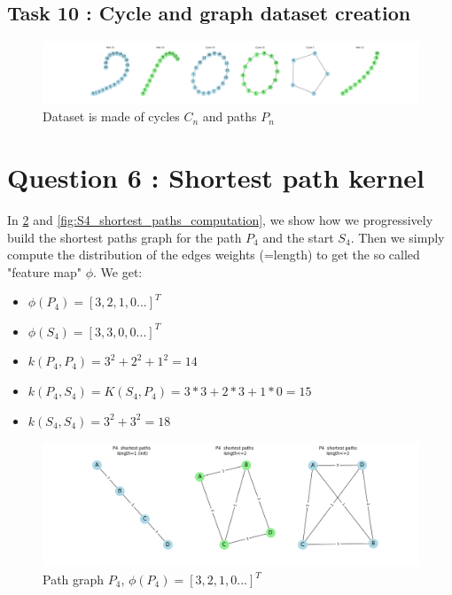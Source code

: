 \documentclass[a4paper]{article}
\begin{document}
\subsection*{Task 10 : Cycle and graph dataset creation}

\begin{figure}[ht]
        \centering
        \includegraphics[width=1.\textwidth]{figures/cycle_and_paths_dataset.png}
        \caption{Dataset is made of cycles $C_n$ and paths $P_n$}
        \label{fig:cycle_and_paths_dataset}
\end{figure}


\section{Question 6 : Shortest path kernel}
In \ref{fig:P4_shortest_paths_computation} and \ref{fig:S4_shortest_paths_computation}, we show 
how we progressively build the shortest paths graph for the path $P_4$ and the start $S_4$.
Then we simply compute the distribution of the edges weights (=length) to get the so called "feature map" $\phi$.
We get:
\begin{itemize}
    \item $\phi(P_4)=[3, 2, 1, 0 ...]^T$
    \item $\phi(S_4)=[3, 3, 0, 0 ...]^T$
    \item $k(P_4, P_4) = 3^2 + 2^2 + 1^2 = 14$
    \item $k(P_4, S_4) = K(S_4, P_4) = 3*3+2*3+1*0 = 15$
    \item $k(S_4, S_4) = 3^2 + 3^2 = 18$
\end{itemize}

\begin{figure}[ht]
        \centering
        \includegraphics[width=1.\textwidth]{figures/P4_shortest_paths_computation.png}
        \caption{Path graph $P_4$, $\phi(P_4)=[3, 2, 1, 0 ...]^T$}
        \label{fig:P4_shortest_paths_computation}
\end{figure}
\end{document}
